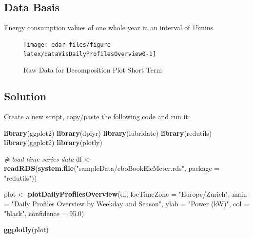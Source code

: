 \documentclass[
  a4paperpaper,
]{book}
\newenvironment{Shaded}{\begin{snugshade}}{\end{snugshade}}
\newcommand{\CommentTok}[1]{\textcolor[rgb]{0.56,0.35,0.01}{\textit{#1}}}
\newcommand{\DataTypeTok}[1]{\textcolor[rgb]{0.13,0.29,0.53}{#1}}
\newcommand{\FloatTok}[1]{\textcolor[rgb]{0.00,0.00,0.81}{#1}}
\newcommand{\KeywordTok}[1]{\textcolor[rgb]{0.13,0.29,0.53}{\textbf{#1}}}
\newcommand{\NormalTok}[1]{#1}
\newcommand{\StringTok}[1]{\textcolor[rgb]{0.31,0.60,0.02}{#1}}
\let\oldShaded\Shaded
\let\endoldShaded\endShaded
\renewenvironment{Shaded}{\footnotesize\oldShaded}{\endoldShaded}
\begin{document}
\hypertarget{data-basis-12}{%
\subsection{Data Basis}\label{data-basis-12}}

Energy consumption values of one whole year in an interval of 15mins.

\begin{figure}
\texttt{[image: edar\_files/figure-latex/dataVisDailyProfilesOverview0-1]} \caption{Raw Data for Decomposition Plot Short Term}\label{fig:dataVisDailyProfilesOverview0}
\end{figure}

\newpage

\hypertarget{solution-12}{%
\subsection{Solution}\label{solution-12}}

Create a new script, copy/paste the following code and run it:

\begin{Shaded}
\begin{Highlighting}[]
\KeywordTok{library}\NormalTok{(ggplot2)}
\KeywordTok{library}\NormalTok{(dplyr)}
\KeywordTok{library}\NormalTok{(lubridate)}
\KeywordTok{library}\NormalTok{(redutils)}
\KeywordTok{library}\NormalTok{(ggplot2)}
\KeywordTok{library}\NormalTok{(plotly)}

\CommentTok{# load time series data}
\NormalTok{df <-}\StringTok{ }\KeywordTok{readRDS}\NormalTok{(}\KeywordTok{system.file}\NormalTok{(}\StringTok{"sampleData/eboBookEleMeter.rds"}\NormalTok{, }\DataTypeTok{package =} \StringTok{"redutils"}\NormalTok{))}

\NormalTok{plot <-}\StringTok{ }\KeywordTok{plotDailyProfilesOverview}\NormalTok{(df,}
                               \DataTypeTok{locTimeZone =} \StringTok{"Europe/Zurich"}\NormalTok{,}
                               \DataTypeTok{main =} \StringTok{"Daily Profiles Overview by Weekday and Season"}\NormalTok{,}
                               \DataTypeTok{ylab =} \StringTok{"Power (kW)"}\NormalTok{,}
                               \DataTypeTok{col =} \StringTok{"black"}\NormalTok{,}
                               \DataTypeTok{confidence =} \FloatTok{95.0}\NormalTok{)}

\KeywordTok{ggplotly}\NormalTok{(plot)}
\end{Highlighting}
\end{Shaded}
\end{document}

